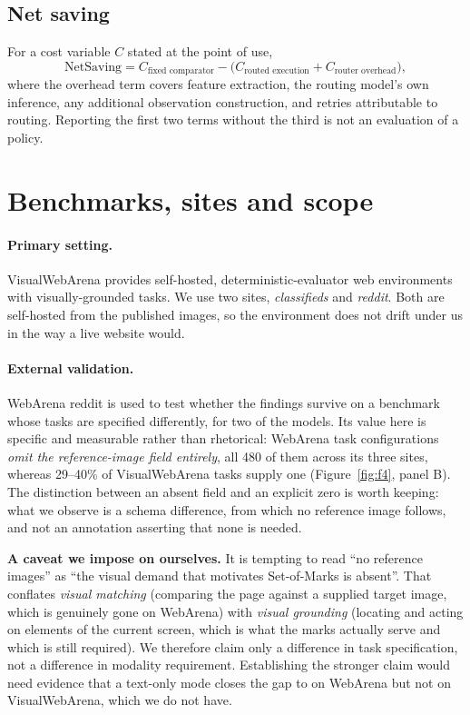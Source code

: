 \subsection{Net saving}

For a cost variable $C$ stated at the point of use,
\begin{equation}
  \mathrm{NetSaving} = C_{\text{fixed comparator}} -
    \bigl(C_{\text{routed execution}} + C_{\text{router overhead}}\bigr),
  \label{eq:netsaving}
\end{equation}
where the overhead term covers feature extraction, the routing model's own
inference, any additional observation construction, and retries attributable to
routing. Reporting the first two terms without the third is not an evaluation of
a policy.

\FloatBarrier
\section{Benchmarks, sites and scope}
\label{sec:benchmarks}

\paragraph{Primary setting.} VisualWebArena \citep{koh2024visualwebarena}
provides self-hosted, deterministic-evaluator web environments with
visually-grounded tasks. We use two sites, \emph{classifieds} and
\emph{reddit}. Both are self-hosted from the published images, so the
environment does not drift under us in the way a live website would.

\paragraph{External validation.} WebArena \citep{zhou2024webarena} reddit is
used to test whether the findings survive on a benchmark whose tasks are
specified differently, for two of the models. Its value here is
specific and measurable rather than rhetorical: WebArena task
configurations \emph{omit the reference-image field entirely}, all 480 of them across its three sites, whereas 29--40\% of VisualWebArena tasks supply
one (Figure~\ref{fig:f4}, panel B). The distinction between an absent field and
an explicit zero is worth keeping: what we observe is a schema difference, from
which no reference image follows, and not an annotation asserting that none is
needed.

\begin{scopebox}
\textbf{A caveat we impose on ourselves.} It is tempting to read ``no reference
images'' as ``the visual demand that motivates Set-of-Marks is absent''. That conflates \emph{visual matching} (comparing the page against a supplied target image, which is genuinely gone on WebArena) with \emph{visual grounding} (locating and acting on elements of the current screen, which is what the marks actually serve and which is still required). We therefore claim
only a difference in task specification, not a difference in modality
requirement. Establishing the stronger claim would need evidence that a
text-only mode closes the gap to \mSoM{} on WebArena but not on VisualWebArena,
which we do not have.
\end{scopebox}

